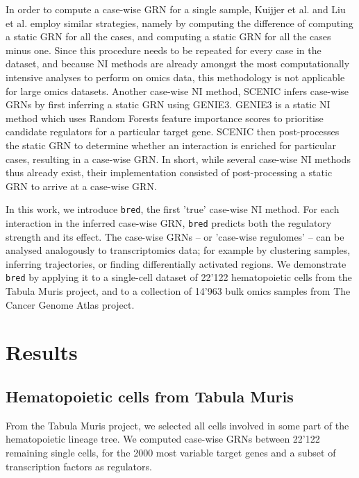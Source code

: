 In order to compute a case-wise GRN for a single sample, Kuijjer et al.\cite{kuijjer_estimatingsamplespecificregulatory_2019} and Liu et al.\cite{liu_personalizedcharacterizationdiseases_2016} employ similar strategies, namely by computing the difference of computing a static GRN for all the cases, and computing a static GRN for all the cases minus one. Since this procedure needs to be repeated for every case in the dataset, and because NI methods are already amongst the most computationally intensive analyses to perform on omics data, this methodology is not applicable for large omics datasets.
Another case-wise NI method, SCENIC\cite{aibar_scenicsinglecellregulatory_2017} infers case-wise GRNs by first inferring a static GRN using GENIE3\cite{huynh-thu_inferringregulatorynetworks_2010}. GENIE3 is a static NI method which uses Random Forests\cite{breiman_randomforests_2001} feature importance scores to prioritise candidate regulators for a particular target gene. SCENIC then post-processes the static GRN to determine whether an interaction is enriched for particular cases, resulting in a case-wise GRN. 
In short, while several case-wise NI methods thus already exist, their implementation consisted of post-processing a static GRN to arrive at a case-wise GRN. 

In this work, we introduce \texttt{bred}, the first 'true' case-wise NI method. For each interaction in the inferred case-wise GRN, \texttt{bred} predicts both the regulatory strength and its effect. 
The case-wise GRNs -- or 'case-wise regulomes' -- can be analysed analogously to transcriptomics data; for example by clustering samples, inferring trajectories, or finding differentially activated regions.
We demonstrate \texttt{bred} by applying it to a single-cell dataset of 22'122 hematopoietic cells from the Tabula Muris project\cite{schaum_singlecelltranscriptomics20_2018}, and to a collection of 14'963 bulk omics samples from The Cancer Genome Atlas project\cite{weinstein_cancergenomeatlas_2013}.


\section{Results}


\subsection{Hematopoietic cells from Tabula Muris}
From the Tabula Muris\cite{schaum_singlecelltranscriptomics20_2018} project, we selected all cells involved in some part of the hematopoietic lineage tree. We computed case-wise GRNs between 22'122 remaining single cells, for the 2000 most variable target genes and a subset of transcription factors as regulators.

